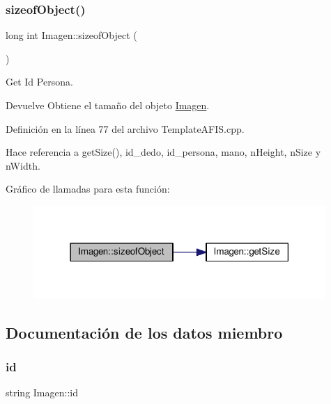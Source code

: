\hypertarget{classImagen_afae009c9516b1d67bf7aca237f6ef403}{}\label{classImagen_afae009c9516b1d67bf7aca237f6ef403} 
\subsubsection{\texorpdfstring{sizeof\+Object()}{sizeofObject()}}
{\footnotesize\ttfamily long int Imagen\+::sizeof\+Object (\begin{DoxyParamCaption}{ }\end{DoxyParamCaption})}



Get Id Persona. 

\begin{DoxyReturn}{Devuelve}
Obtiene el tamaño del objeto \hyperlink{classImagen}{Imagen}. 
\end{DoxyReturn}


Definición en la línea 77 del archivo Template\+A\+F\+I\+S.\+cpp.



Hace referencia a get\+Size(), id\+\_\+dedo, id\+\_\+persona, mano, n\+Height, n\+Size y n\+Width.

Gráfico de llamadas para esta función\+:\nopagebreak
\begin{figure}[H]
\begin{center}
\leavevmode
\includegraphics[width=314pt]{classImagen_afae009c9516b1d67bf7aca237f6ef403_cgraph}
\end{center}
\end{figure}


\subsection{Documentación de los datos miembro}
\hypertarget{classImagen_a92940ae8127167d1a7041a365555a931}{}\label{classImagen_a92940ae8127167d1a7041a365555a931} 
\subsubsection{\texorpdfstring{id}{id}}
{\footnotesize\ttfamily string Imagen\+::id}



